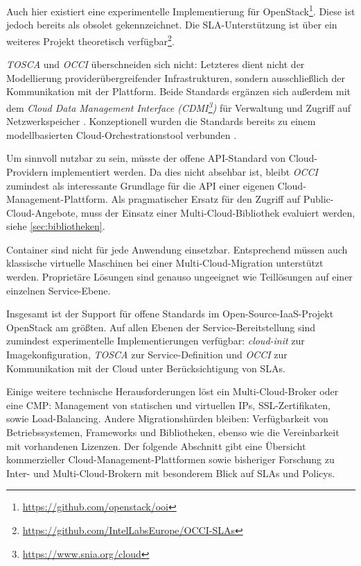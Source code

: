\begin{description}
	
	Auch hier existiert eine experimentelle Implementierung für OpenStack\footnote{\url{https://github.com/openstack/ooi}}. Diese ist jedoch bereits als obsolet gekennzeichnet. Die SLA-Unterstützung ist über ein weiteres Projekt theoretisch verfügbar\footnote{\url{https://github.com/IntelLabsEurope/OCCI-SLAs}}.
	
	\emph{TOSCA} und \emph{OCCI} überschneiden sich nicht: Letzteres dient nicht der Modellierung providerübergreifender Infrastrukturen, sondern ausschließlich der Kommunikation mit der Plattform. Beide Standards ergänzen sich außerdem mit dem \emph{Cloud Data Management Interface (CDMI\footnote{\url{https://www.snia.org/cloud}})} für Verwaltung und Zugriff auf Netzwerkspeicher \cite{snia:2015:cdmi}. Konzeptionell wurden die Standards bereits zu einem modellbasierten Cloud-Orchestrationstool verbunden \cite{korte:2017:toscamp, carrasco:2018:toscamp}.
	
	Um sinnvoll nutzbar zu sein, müsste der offene API-Standard von Cloud-Providern implementiert werden. Da dies nicht absehbar ist, bleibt \emph{OCCI} zumindest als interessante Grundlage für die API einer eigenen Cloud-Management-Plattform. Als pragmatischer Ersatz für den Zugriff auf Public-Cloud-Angebote, muss der Einsatz einer Multi-Cloud-Bibliothek evaluiert werden, siehe \autoref{sec:bibliotheken}.		
	
\end{description}

\noindent
Container sind nicht für jede Anwendung einsetzbar. Entsprechend müssen auch klassische virtuelle Maschinen bei einer Multi-Cloud-Migration unterstützt werden. Proprietäre Lösungen sind genauso ungeeignet wie Teillösungen auf einer einzelnen Service-Ebene.

Insgesamt ist der Support für offene Standards im Open-Source-IaaS-Projekt OpenStack am größten. Auf allen Ebenen der Service-Bereitstellung sind zumindest experimentelle Implementierungen verfügbar: \emph{cloud-init} zur Imagekonfiguration, \emph{TOSCA} zur Service-Definition und \emph{OCCI} zur Kommunikation mit der Cloud unter Berücksichtigung von SLAs. 

Einige weitere technische Herausforderungen löst ein Multi-Cloud-Broker oder eine CMP: Management von statischen und virtuellen IPs, SSL-Zertifikaten, sowie Load-Balancing. Andere Migrationshürden bleiben: Verfügbarkeit von Betriebssystemen, Frameworks und Bibliotheken, ebenso wie die Vereinbarkeit mit vorhandenen Lizenzen. Der folgende Abschnitt gibt eine Übersicht kommerzieller Cloud-Management-Plattformen sowie bisheriger Forschung zu Inter- und Multi-Cloud-Brokern mit besonderem Blick auf SLAs und Policys. 

